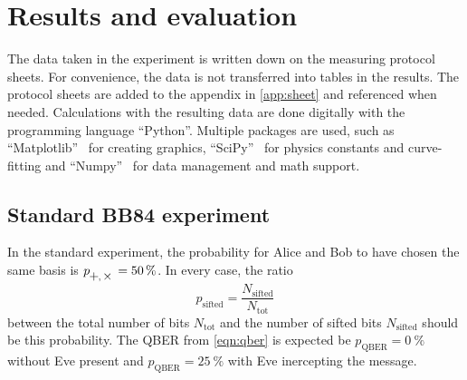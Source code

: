 \section{Results and evaluation}
\label{sec:Auswertung}
%
The data taken in the experiment is written down on the measuring protocol sheets.
For convenience, the data is not transferred into tables in the results.
The protocol sheets are added to the appendix in \autoref{app:sheet} and referenced when needed.
\newline\noindent
Calculations with the resulting data are done digitally with the programming language \enquote{Python}.
Multiple packages are used, such as \enquote{Matplotlib}~\cite{matplotlib} for creating graphics, \enquote{SciPy}~\cite{scipy} for physics constants and curve-fitting and \enquote{Numpy}~\cite{numpy} for data management and math support.
%
\subsection{Standard BB84 experiment}
In the standard experiment, the probability for Alice and Bob to have chosen the same basis is $p_{\mathrm{\rotatebox[origin=c]{90}{+},\rotatebox[origin=c]{45}{+}}} = \qty{50}{\percent}$.
In every case, the ratio
\begin{equation*}
    p_{\mathrm{sifted}} = \frac{N_{\mathrm{sifted}}}{N_{\mathrm{tot}}}
\end{equation*}
between the total number of bits $N_{\mathrm{tot}}$ and the number of sifted bits $N_{\mathrm{sifted}}$ should be this probability.
\newline\noindent
The QBER from \autoref{eqn:qber} is expected be $p_{\mathrm{QBER}} = \qty{0}{\percent}$ without Eve present and $p_{\mathrm{QBER}} = \qty{25}{\percent}$ with Eve inercepting the message.
%
